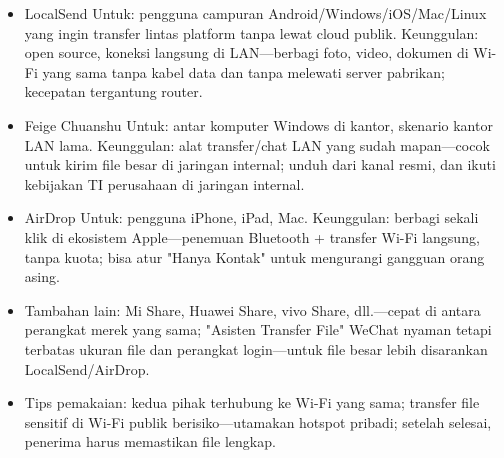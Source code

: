 
\begin{itemize}
  \item LocalSend Untuk: pengguna campuran Android/Windows/iOS/Mac/Linux yang ingin transfer lintas platform tanpa lewat cloud publik. Keunggulan: open source, koneksi langsung di LAN—berbagi foto, video, dokumen di Wi-Fi yang sama tanpa kabel data dan tanpa melewati server pabrikan; kecepatan tergantung router.
  \item Feige Chuanshu Untuk: antar komputer Windows di kantor, skenario kantor LAN lama. Keunggulan: alat transfer/chat LAN yang sudah mapan—cocok untuk kirim file besar di jaringan internal; unduh dari kanal resmi, dan ikuti kebijakan TI perusahaan di jaringan internal.
  \item AirDrop Untuk: pengguna iPhone, iPad, Mac. Keunggulan: berbagi sekali klik di ekosistem Apple—penemuan Bluetooth + transfer Wi-Fi langsung, tanpa kuota; bisa atur "Hanya Kontak" untuk mengurangi gangguan orang asing.
  \item Tambahan lain: Mi Share, Huawei Share, vivo Share, dll.—cepat di antara perangkat merek yang sama; "Asisten Transfer File" WeChat nyaman tetapi terbatas ukuran file dan perangkat login—untuk file besar lebih disarankan LocalSend/AirDrop.
  \item Tips pemakaian: kedua pihak terhubung ke Wi-Fi yang sama; transfer file sensitif di Wi-Fi publik berisiko—utamakan hotspot pribadi; setelah selesai, penerima harus memastikan file lengkap.
\end{itemize}


